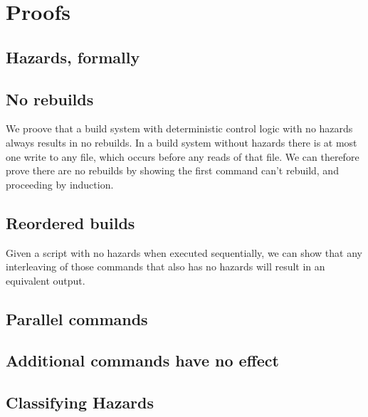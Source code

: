 \section{Proofs}

\subsection{Hazards, formally}

\subsection{No rebuilds}
\label{sec:proof:no_rebuild}

We proove that a build system with deterministic control logic with no hazards always results in no rebuilds.
In a build system without hazards there is at most one write to any file, which occurs before any reads of that file. We can therefore prove there are no rebuilds by showing the first command can't rebuild, and proceeding by induction.

\subsection{Reordered builds}
\label{sec:proof:reorder}

Given a script with no hazards when executed sequentially, we can show that any interleaving of those commands that also has no hazards will result in an equivalent output.

\subsection{Parallel commands}
\label{sec:proof:parallel}

\subsection{Additional commands have no effect}
\label{sec:proof:additional}

\subsection{Classifying Hazards}
\label{sec:proof:classify_hazard}
